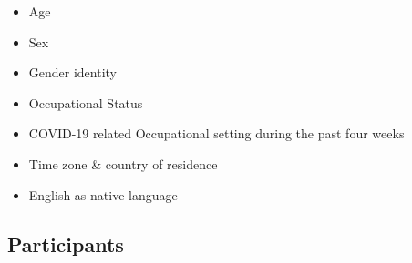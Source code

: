 \documentclass[
  english,
  man]{apa6}
\providecommand{\tightlist}{%
  \setlength{\itemsep}{0pt}\setlength{\parskip}{0pt}}
\begin{document}
\begin{itemize}
\tightlist
\item
  Age
\item
  Sex
\item
  Gender identity
\item
  Occupational Status
\item
  COVID-19 related Occupational setting during the past four weeks
\item
  Time zone \& country of residence
\item
  English as native language
\end{itemize}

\hypertarget{participants}{%
\subsection{Participants}\label{participants}}
\end{document}
